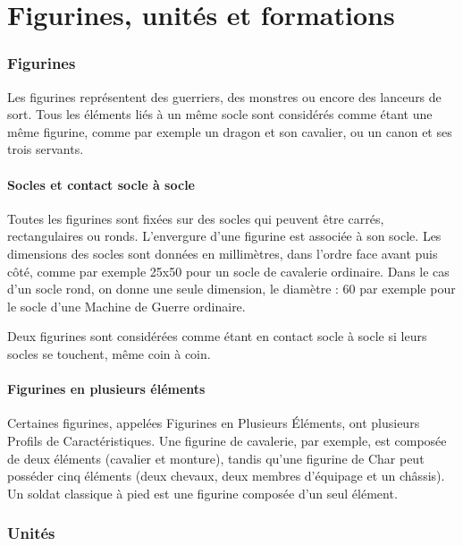 
\part{Figurines, unités et formations}

\section{Figurines}

Les figurines représentent des guerriers, des monstres ou encore des lanceurs de sort. Tous les éléments liés à un même socle sont considérés comme étant une même figurine, comme par exemple un dragon et son cavalier, ou un canon et ses trois servants.

\subsection{Socles et contact socle à socle}

Toutes les figurines sont fixées sur des socles qui peuvent être carrés, rectangulaires ou ronds. L'envergure d'une figurine est associée à son socle. Les dimensions des socles sont données en millimètres, dans l'ordre face avant puis côté, comme par exemple \unit{25x50}{\milli\meter} pour un socle de cavalerie ordinaire. Dans le cas d'un socle rond, on donne une seule dimension, le diamètre : \unit{60}{\milli\meter} par exemple pour le socle d'une Machine de Guerre ordinaire.

Deux figurines sont considérées comme étant en contact socle à socle si leurs socles se touchent, même coin à coin.

\subsection{Figurines en plusieurs éléments}

Certaines figurines, appelées Figurines en Plusieurs Éléments, ont plusieurs Profils de Caractéristiques. Une figurine de cavalerie, par exemple, est composée de deux éléments (cavalier et monture), tandis qu'une figurine de Char peut posséder cinq éléments (deux chevaux, deux membres d'équipage et un châssis). Un soldat classique à pied est une figurine composée d'un seul élément. 

\section{Unités}

